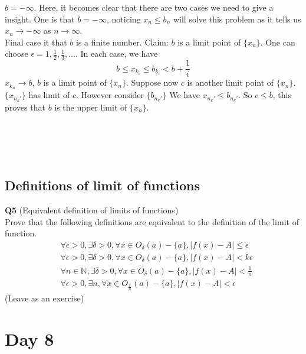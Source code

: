 \documentclass{article}
\newcommand{\tb}[1]{\textbf{#1}}
\begin{document}
$b = -\infty$. Here, it becomes clear that there are two cases we need to give a insight. One is that $b = -\infty$, noticing $x_n \leq b_n$ will solve this problem as 
it tells us $x_n \rightarrow -\infty$ as $n \rightarrow \infty$.\\
Final case it that $b$ is a finite number. Claim: $b$ is a limit point of $\{x_n\}$. One can choose $\epsilon = 1,\frac{1}{2}, \frac{1}{3}, \dots$. In each case, we have 
$$
b \leq x_{k_i} \leq b_{k_{i}} < b + \frac{1}{i}
$$
$x_{k_n}\rightarrow b$, $b$ is a limit point of $\{x_n\}$. Suppose now $c$ is another limit point of $\{x_n\}$. $\{x_{n_k'}\}$ has limit of $c$. However consider $\{b_{n_k'}\}$
We have $x_{n_k'} \leq b_{n_k'}$. So $c\leq b$, this proves that $b$ is the upper limit of $\{x_n\}$.\\
\\
\\
\\
\\
\subsection{Definitions of limit of functions}
\tb{Q5} (Equivalent definition of limits of functions)\\
Prove that the following definitions are equivalent to the definition of the limit of function.
\begin{align}
    &\forall \epsilon > 0, \exists \delta > 0, \forall x \in O_\delta (a) - \{a\}, |f(x) - A| \leq \epsilon \tag{Definition 1}\\
    &\forall \epsilon > 0, \exists \delta > 0, \forall x \in O_\delta (a) - \{a\}, |f(x) - A| < k\epsilon \tag{Definition 2}\\
    &\forall n \in \mathbb{N}, \exists \delta > 0, \forall x \in O_\delta (a) - \{a\}, |f(x) - A| < \frac{1}{n} \tag{Definition 3}\\
    &\forall \epsilon > 0, \exists n, \forall x \in O_\frac{1}{n} (a) - \{a\}, |f(x) - A| < \epsilon \tag{Definition 4}
\end{align} 
(Leave as an exercise)
\newpage
\section{Day 8}
\end{document}
